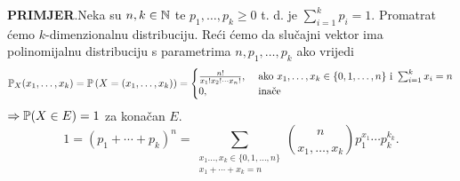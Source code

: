 \documentclass{article}
\begin{document}
\textbf{PRIMJER}.\newline Neka su \(n,k\in\Bbb N\) te \(p_1,\ldots,p_k\ge 0\) t. d. je \(\sum_{i=1}^kp_i=1.\) Promatrat ćemo \(k\)-dimenzionalnu distribuciju. Reći ćemo da slučajni vektor ima polinomijalnu distribuciju s parametrima \(n,p_1,\ldots,p_k\) ako vrijedi \[\Bbb P_X(x_1,\ldots,x_k)=\Bbb P\left(X=(x_1,\ldots,x_k)\right)=\begin{cases}\frac{n!}{x_1!x_2!\cdots x_n!},&\text{ ako } x_1,\ldots,x_k\in\{0,1,\ldots,n\} \text{ i }\sum_{i=1}^kx_i=n\\0,&\text{ inače}\end{cases}\] \(\Rightarrow\Bbb P(X\in E)=1\) za konačan \(E.\) \[1=(p_1+\cdots+p_k)^n=\sum_{\substack{x_1\ldots,x_k\in\{0,1,\ldots,n\}\\x_1+\cdots+x_k=n}}\binom{n}{x_1,\ldots,x_k}p_1^{x_1}\cdots p_k^{k_k}.\]
\end{document}
